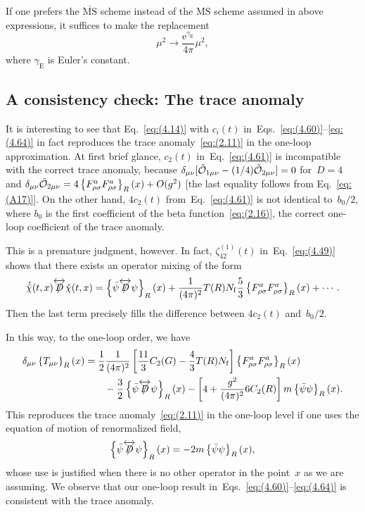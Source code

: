 If one prefers the $\overline{\text{MS}}$ scheme instead of the $\text{MS}$
scheme assumed in above expressions, it suffices to make the replacement
\begin{equation}
    \mu^2\to\frac{\mathrm{e}^{\gamma_{\mathrm{E}}}}{4\pi}\mu^2,
\label{eq:(4.65)}
\end{equation}
where $\gamma_{\mathrm{E}}$ is Euler's constant.

\subsection{A consistency check: The trace anomaly}
It is interesting to see that Eq.~\eqref{eq:(4.14)} with $c_i(t)$
in~Eqs.~\eqref{eq:(4.60)}--\eqref{eq:(4.64)} in fact reproduces the trace
anomaly~\eqref{eq:(2.11)} in the one-loop approximation. At first brief glance,
$c_2(t)$ in~Eq.~\eqref{eq:(4.61)} is incompatible with the correct trace
anomaly, because $\delta_{\mu\nu}[\Tilde{\mathcal{O}}_{1\mu\nu}
-(1/4)\Tilde{\mathcal{O}}_{2\mu\nu}]=0$ for~$D=4$ and
$\delta_{\mu\nu}\Tilde{\mathcal{O}}_{2\mu\nu}
=4\left\{F_{\rho\sigma}^aF_{\rho\sigma}^a\right\}_R(x)+O(g^2)$ [the last equality
follows from Eq.~\eqref{eq:(A17)}]. On the other hand, $4c_2(t)$
from~Eq.~\eqref{eq:(4.61)} is not identical to~$b_0/2$, where $b_0$ is the
first coefficient of the beta function~\eqref{eq:(2.16)}, the correct one-loop
coefficient of the trace anomaly.

This is a premature judgment, however. In fact, $\zeta_{42}^{(1)}(t)$
in~Eq.~\eqref{eq:(4.49)} shows that there exists an operator mixing of the form
\begin{equation}
   \mathring{\Bar{\chi}}(t,x)
   \overleftrightarrow{\Slash{D}}
   \mathring{\chi}(t,x)
   =\left\{\Bar{\psi}\overleftrightarrow{\Slash{D}}\psi\right\}_R(x)
   +\frac{1}{(4\pi)^2}T(R)N_{\mathrm{f}}\frac{5}{3}
   \left\{F_{\rho\sigma}^aF_{\rho\sigma}^a\right\}_R(x)
   +\dotsb.
\label{eq:(4.66)}
\end{equation}
Then the last term precisely fills the difference between $4c_2(t)$
and~$b_0/2$.

In this way, to the one-loop order, we have
\begin{align}
   \delta_{\mu\nu}\left\{T_{\mu\nu}\right\}_R(x)
   &=\frac{1}{2}\frac{1}{(4\pi)^2}
   \left[\frac{11}{3}C_2(G)-\frac{4}{3}T(R)N_{\mathrm{f}}\right]
   \left\{F_{\rho\sigma}^aF_{\rho\sigma}^a\right\}_R(x)
\notag\\
   &\qquad{}
   -\frac{3}{2}
   \left\{\Bar{\psi}\overleftrightarrow{\Slash{D}}\psi\right\}_R(x)
   -\left[4+\frac{g^2}{(4\pi)^2}6C_2(R)\right]
   m\left\{\Bar{\psi}\psi\right\}_R(x).
\label{eq:(4.67)}
\end{align}
This reproduces the trace anomaly~\eqref{eq:(2.11)} in the one-loop level if
one uses the equation of motion of renormalized field,
\begin{equation}
   \left\{\Bar{\psi}\overleftrightarrow{\Slash{D}}\psi\right\}_R(x)
   =-2m\left\{\Bar{\psi}\psi\right\}_R(x),
\label{eq:(4.68)}
\end{equation}
whose use is justified when there is no other operator in the point~$x$ as we
are assuming. We observe that our one-loop result
in~Eqs.~\eqref{eq:(4.60)}--\eqref{eq:(4.64)} is consistent with the trace
anomaly.

